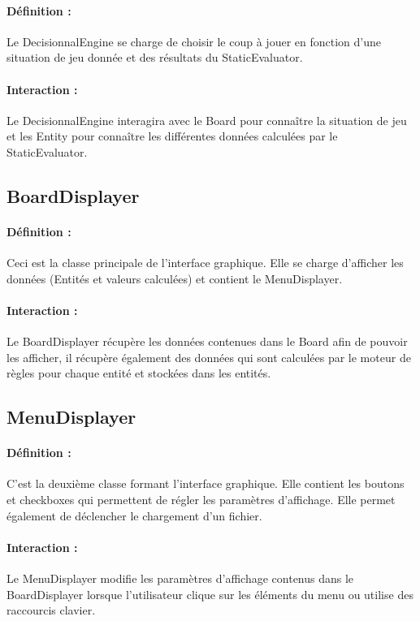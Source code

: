 			\paragraph{Définition :}
			Le DecisionnalEngine se charge de choisir le coup à jouer en fonction d'une situation de jeu donnée et des résultats 
			du StaticEvaluator.
			\paragraph{Interaction :}
			Le DecisionnalEngine interagira avec le Board pour connaître la situation de jeu et les Entity pour connaître les 
			différentes données calculées par le StaticEvaluator.

		\subsection*{BoardDisplayer}

			\paragraph{Définition :}
			Ceci est la classe principale de l'interface graphique. Elle se charge d'afficher les données (Entités et valeurs calculées)
			et contient le MenuDisplayer.
			\paragraph{Interaction :}
			Le BoardDisplayer récupère les données contenues dans le Board afin de pouvoir les afficher, il récupère également des données qui sont calculées
			par le moteur de règles pour chaque entité et stockées dans les entités.

		\subsection*{MenuDisplayer}

			\paragraph{Définition :}
			C'est la deuxième classe formant l'interface graphique. Elle contient les boutons et checkboxes qui permettent
			de régler les paramètres d'affichage. Elle permet également de déclencher le chargement d'un fichier.
			\paragraph{Interaction :}
			Le MenuDisplayer modifie les paramètres d'affichage contenus dans le BoardDisplayer lorsque l'utilisateur clique
			sur les éléments du menu ou utilise des raccourcis clavier.

